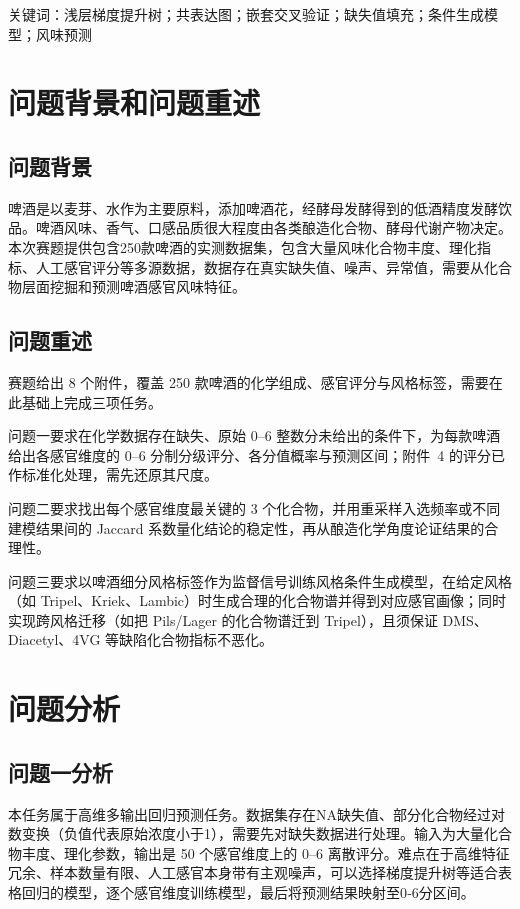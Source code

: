 \documentclass[12pt,a4paper]{article}
\begin{document}
关键词：浅层梯度提升树；共表达图；嵌套交叉验证；缺失值填充；条件生成模型；风味预测
\tableofcontents
\newpage
\section{问题背景和问题重述}
\subsection{问题背景}
啤酒是以麦芽、水作为主要原料，添加啤酒花，经酵母发酵得到的低酒精度发酵饮品。啤酒风味、香气、口感品质很大程度由各类酿造化合物、酵母代谢产物决定。本次赛题提供包含250款啤酒的实测数据集，包含大量风味化合物丰度、理化指标、人工感官评分等多源数据，数据存在真实缺失值、噪声、异常值，需要从化合物层面挖掘和预测啤酒感官风味特征。

\subsection{问题重述}
赛题给出 8 个附件，覆盖 250 款啤酒的化学组成、感官评分与风格标签，需要在此基础上完成三项任务。

问题一要求在化学数据存在缺失、原始 0--6 整数分未给出的条件下，为每款啤酒给出各感官维度的 0--6 分制分级评分、各分值概率与预测区间；附件~4 的评分已作标准化处理，需先还原其尺度。

问题二要求找出每个感官维度最关键的 3 个化合物，并用重采样入选频率或不同建模结果间的 Jaccard 系数量化结论的稳定性，再从酿造化学角度论证结果的合理性。

问题三要求以啤酒细分风格标签作为监督信号训练风格条件生成模型，在给定风格（如 Tripel、Kriek、Lambic）时生成合理的化合物谱并得到对应感官画像；同时实现跨风格迁移（如把 Pils/Lager 的化合物谱迁到 Tripel），且须保证 DMS、Diacetyl、4VG 等缺陷化合物指标不恶化。
\section{问题分析}
\subsection{问题一分析}
本任务属于高维多输出回归预测任务。数据集存在NA缺失值、部分化合物经过对数变换（负值代表原始浓度小于1），需要先对缺失数据进行处理。输入为大量化合物丰度、理化参数，输出是 50 个感官维度上的 0--6 离散评分。难点在于高维特征冗余、样本数量有限、人工感官本身带有主观噪声，可以选择梯度提升树等适合表格回归的模型，逐个感官维度训练模型，最后将预测结果映射至0‑6分区间。
\end{document}
